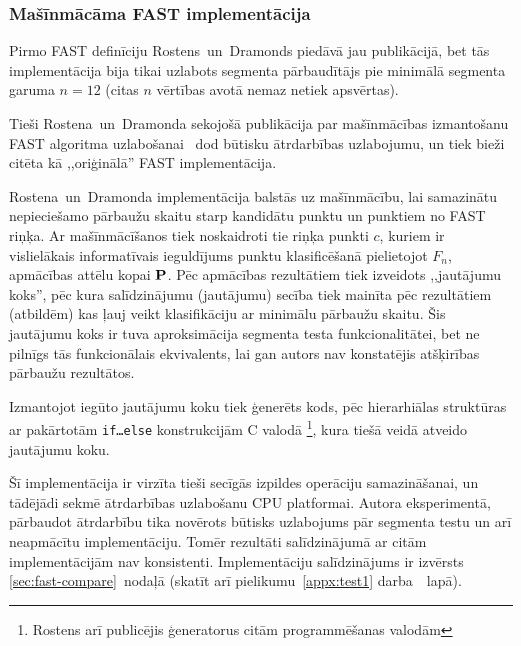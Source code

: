 \subsubsection{Mašīnmācāma FAST implementācija} \label{sec:fast-original}
Pirmo FAST definīciju Rostens~un~Dramonds piedāvā jau \cite{Rosten-tracking}
publikācijā, bet tās implementācija bija tikai uzlabots segmenta
pārbaudītājs pie minimālā segmenta garuma $n=12$
(citas $n$ vērtības \cite{Rosten-tracking} avotā nemaz netiek apsvērtas).

Tieši Rostena~un~Dramonda sekojošā publikācija par mašīnmācības
izmantošanu FAST algoritma uzlabošanai~\cite{FAST} dod būtisku
ātrdarbības uzlabojumu, un tiek bieži citēta kā ,,oriģinālā'' FAST
implementācija.

Rostena~un~Dramonda\cite{FAST} implementācija balstās uz
mašīnmācību, lai samazinātu nepieciešamo pārbaužu skaitu starp
kandidātu punktu un punktiem no FAST riņķa. Ar mašīnmācīšanos tiek
noskaidroti tie riņķa punkti $c$, kuriem ir vislielākais informatīvais
ieguldījums punktu klasificēšanā pielietojot $F_n$, apmācības attēlu
kopai $\mathbf{P}$. Pēc apmācības rezultātiem tiek izveidots
,,jautājumu koks'', pēc kura salīdzinājumu (jautājumu) secība tiek
mainīta pēc rezultātiem (atbildēm) kas ļauj veikt klasifikāciju ar
minimālu pārbaužu skaitu. Šis jautājumu koks ir tuva aproksimācija
segmenta testa funkcionalitātei, bet ne pilnīgs tās funkcionālais
ekvivalents, lai gan autors nav konstatējis atšķirības
pārbaužu rezultātos. \cite{FAST}

Izmantojot iegūto jautājumu koku tiek ģenerēts kods, pēc hierarhiālas
struktūras ar pakārtotām \texttt{if\ldots{}else} konstrukcijām C valodā%
\footnote{Rostens arī publicējis ģeneratorus citām programmēšanas valodām},
kura tiešā veidā atveido jautājumu koku. \cite{FAST}

Šī implementācija ir virzīta tieši secīgās izpildes operāciju samazināšanai,
un tādējādi sekmē ātrdarbības uzlabošanu CPU platformai. Autora eksperimentā,
pārbaudot ātrdarbību tika novērots būtisks uzlabojums pār segmenta testu un
arī neapmācītu implementāciju. Tomēr rezultāti salīdzinājumā ar citām
implementācijām nav konsistenti. Implementāciju salīdzinājums ir izvērsts
\ref{sec:fast-compare}~nodaļā
(skatīt arī pielikumu~\ref{appx:test1} darba~\pageref{appx:test1}~lapā).
